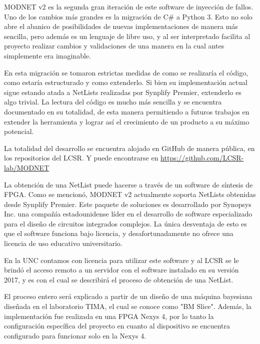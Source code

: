MODNET v2 es la segunda gran iteración de este software de inyección de fallos. Uno de los cambios más grandes es la migración de C\# a Python 3. Esto no solo abre el abanico de posibilidades de nuevas implementaciones de manera más sencilla, pero además es un lenguaje de libre uso, y al ser interpretado facilita al proyecto realizar cambios y validaciones de una manera en la cual antes simplemente era imaginable.

En esta migración se tomaron estrictas medidas de como se realizaría el código, como estaría estructurado y como extenderlo. Si bien su implementación actual sigue estando atada a NetLists realizadas por Synplify Premier, extenderlo es algo trivial. La lectura del código es mucho más sencilla y se encuentra documentado en su totalidad, de esta manera permitiendo a futuros trabajos en extender la herramienta y lograr así el crecimiento de un producto a su máximo potencial.

La totalidad del desarrollo se encuentra alojado en GitHub de manera pública, en los repositorios del LCSR. Y puede encontrarse en \href{https://github.com/LCSR-lab/MODNET}{https://github.com/LCSR-lab/MODNET}

La obtención de una NetList puede hacerse a través de un software de síntesis de FPGA. Como se mencionó, MODNET v2 actualmente soporta NetLists obtenidas desde Synplify Premier. Este paquete de soluciones es desarrollado por Synopsys Inc. una compañía estadounidense líder en el desarrollo de software especializado para el diseño de circuitos integrados complejos. La única desventaja de esto es que el software funciona bajo licencia, y desafortunadamente no ofrece una licencia de uso educativo universitario.

En la UNC contamos con licencia para utilizar este software y al LCSR se le brindó el acceso remoto a un servidor con el software instalado en su versión 2017, y es con el cual se describirá el proceso de obtención de una NetList.

El proceso entero será explicado a partir de un diseño de una máquina bayesiana diseñada en el laboratorio TIMA, el cual se conoce como "BM Slice". Además, la implementación fue realizada en una FPGA Nexys 4, por lo tanto la configuración específica del proyecto en cuanto al dispositivo se encuentra configurado para funcionar solo en la Nexys 4.